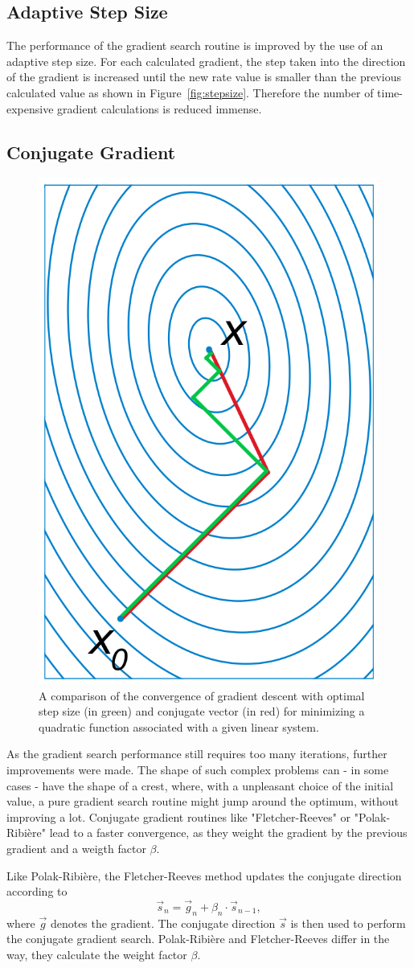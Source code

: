 \subsection{Adaptive Step Size}
\label{sec:grads_stepsize}
The performance of the gradient search routine is improved by the use of an adaptive step size.
For each calculated gradient, the step taken into the direction of the gradient is increased until the new rate value is smaller than the previous calculated value as shown in Figure~\ref{fig:stepsize}.
Therefore the number of time-expensive gradient calculations is reduced immense.



\subsection{Conjugate Gradient}
\label{sec:grads_conjgrad}
\begin{figure}[h]
\centering
\includegraphics[width=0.25\linewidth]{images/conjugate_gradient_example.png}
\caption{A comparison of the convergence of gradient descent with optimal step size (in green) and conjugate vector (in red) for minimizing a quadratic function associated with a given linear system\cite{wiki:conj_grad}.}
\label{fig:conj_grad_ex}
\end{figure}
As the gradient search performance still requires too many iterations, further improvements were made.
The shape of such complex problems can - in some cases - have the shape of a crest, where, with a unpleasant choice of the initial value, a pure gradient search routine might jump around the optimum, without improving a lot.
Conjugate gradient routines like "Fletcher-Reeves" or "Polak-Ribi\`{e}re" lead to a faster convergence, as they weight the gradient by the previous gradient and a weigth factor $\beta$. 

Like Polak-Ribi\`{e}re, the Fletcher-Reeves method updates the conjugate direction according to 
\begin{equation}
\vec{s}_n = \vec{g}_n + \beta_n\cdot\vec{s}_{n-1},
\label{eq:conj_update}
\end{equation}
where $\vec{g}$ denotes the gradient.
The conjugate direction $\vec{s}$ is then used to perform the conjugate gradient search.
Polak-Ribi\`{e}re and Fletcher-Reeves differ in the way, they calculate the weight factor $\beta$.

